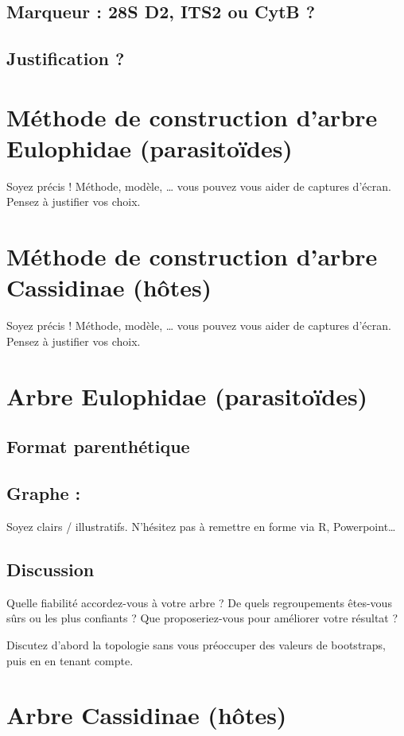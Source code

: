 \documentclass[a4paper, 11pt]{article}
\begin{document}
\subsection{Marqueur : 28S D2, ITS2 ou CytB ?} 

\subsection{Justification ?}

\section{Méthode de construction d'arbre Eulophidae (parasitoïdes)}

Soyez précis ! Méthode, modèle, … vous pouvez vous aider de captures d’écran. Pensez à justifier vos choix.

\section{Méthode de construction d'arbre Cassidinae (hôtes)}

Soyez précis ! Méthode, modèle, … vous pouvez vous aider de captures d’écran. Pensez à justifier vos choix.

\section{Arbre Eulophidae (parasitoïdes)}
\subsection{Format parenthétique} 


\subsection{Graphe :}
Soyez clairs / illustratifs. N’hésitez pas à remettre en forme via R, Powerpoint…

\subsection{Discussion}
Quelle fiabilité accordez-vous à votre arbre ? De quels regroupements êtes-vous sûrs ou les plus confiants ? Que proposeriez-vous pour améliorer votre résultat ?

Discutez d’abord la topologie sans vous préoccuper des valeurs de bootstraps, puis en en tenant compte.

\section{Arbre Cassidinae (hôtes)}
\end{document}
